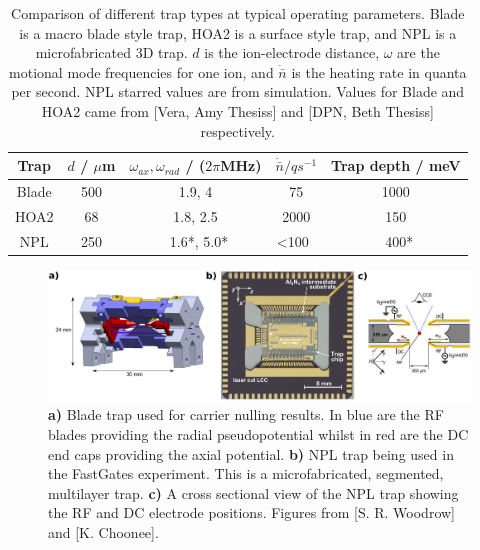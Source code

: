 \documentclass[12pt]{iopart}
\begin{document}
\begin{table}[h!]
\begin{center}
\begin{tabular}{ c|c c c c }
  Trap & $d$ / $\mu$m & $\omega_{ax}, \omega_{rad}$ / ($2\pi$MHz) & $\dot{\bar{n}} / qs^{-1}$ & Trap depth / meV \\ 
  \hline
  Blade  & 500 & 1.9, 4 & 75 & 1000 \\
  HOA2  & 68 & 1.8, 2.5 & 2000 & 150 \\
  NPL  & 250 & ~1.6*, 5.0* & <100~ & ~400* 
\end{tabular}
\caption{Comparison of different trap types at typical operating
  parameters. Blade is a macro blade style trap, HOA2 is a surface
  style trap, and NPL is a microfabricated 3D trap. $d$ is the
  ion-electrode distance, $\omega$ are the motional mode frequencies
  for one ion, and $\dot{\bar{n}}$ is the heating rate in quanta per
  second. NPL starred values are from simulation. Values for Blade and
  HOA2 came from [Vera, Amy Thesiss] and [DPN, Beth Thesiss]
  respectively. }

\end{center}
\label{table:trap}
\end{table}

\begin{figure}
  \begin{center}
   \noindent\includegraphics[width=\linewidth]{figures/trap_comp.png}
  \end{center}
  \caption{\textbf{a)} Blade trap used for carrier nulling results. In
    blue are the RF blades providing the radial pseudopotential whilst
    in red are the DC end caps providing the axial
    potential. \textbf{b)} NPL trap being used in the FastGates
    experiment. This is a microfabricated, segmented, multilayer
    trap. \textbf{c)} A cross sectional view of the NPL trap showing
    the RF and DC electrode positions.
    Figures from [S. R. Woodrow]
    and [K. Choonee].
  }

  \label{fig:trap}
\end{figure}
\end{document}
